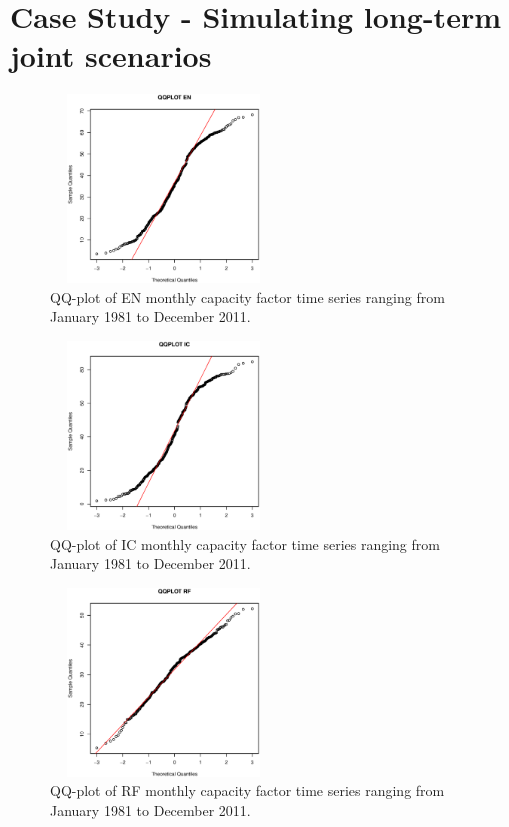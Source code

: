 \documentclass[a4paper]{IEEEtran}
\begin{document}

\section{Case Study - Simulating long-term joint scenarios} \label{Application}


\begin{figure}[htbp]
	\centering
	\includegraphics[height=5cm,width=6cm]{figures/EN_QQ.eps}
	\caption{QQ-plot of EN monthly capacity factor time series ranging from January 1981 to December 2011.}
	\label{qq_EN}
\end{figure}

\begin{figure}[htbp]
	\centering
	\includegraphics[height=5cm,width=6cm]{figures/IC_QQ.eps}
	\caption{QQ-plot of IC monthly capacity factor time series ranging from January 1981 to December 2011.}
	\label{qq_IC}
\end{figure}

\begin{figure}[htbp]
	\centering
	\includegraphics[height=5cm,width=6cm]{figures/RF_QQ.eps}
	\caption{QQ-plot of RF monthly capacity factor time series ranging from January 1981 to December 2011.}
	\label{qq_RF}
\end{figure}
\end{document}
